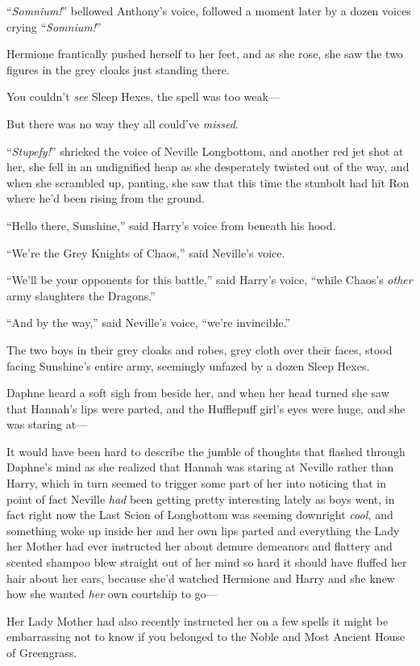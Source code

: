 “\emph{Somnium!}” bellowed Anthony’s voice, followed a moment later by a dozen voices crying “\emph{Somnium!}”

Hermione frantically pushed herself to her feet, and as she rose, she saw the two figures in the grey cloaks just standing there.

You couldn’t \emph{see} Sleep Hexes, the spell was too weak—

But there was no way they all could’ve \emph{missed}.

“\emph{Stupefy!}” shrieked the voice of Neville Longbottom, and another red jet shot at her, she fell in an undignified heap as she desperately twisted out of the way, and when she scrambled up, panting, she saw that this time the stunbolt had hit Ron where he’d been rising from the ground.

“Hello there, Sunshine,” said Harry’s voice from beneath his hood.

“We’re the Grey Knights of Chaos,” said Neville’s voice.

“We’ll be your opponents for this battle,” said Harry’s voice, “while Chaos’s \emph{other} army slaughters the Dragons.”

“And by the way,” said Neville’s voice, “we’re invincible.”

\later

The two boys in their grey cloaks and robes, grey cloth over their faces, stood facing Sunshine’s entire army, seemingly unfazed by a dozen Sleep Hexes.

Daphne heard a soft sigh from beside her, and when her head turned she saw that Hannah’s lips were parted, and the Hufflepuff girl’s eyes were huge, and she was staring at—

It would have been hard to describe the jumble of thoughts that flashed through Daphne’s mind as she realized that Hannah was staring at Neville rather than Harry, which in turn seemed to trigger some part of her into noticing that in point of fact Neville \emph{had} been getting pretty interesting lately as boys went, in fact right now the Last Scion of Longbottom was seeming downright \emph{cool,} and something woke up inside her and her own lips parted and everything the Lady her Mother had ever instructed her about demure demeanors and flattery and scented shampoo blew straight out of her mind so hard it should have fluffed her hair about her ears, because she’d watched Hermione and Harry and she knew how she wanted \emph{her} own courtship to go—

Her Lady Mother had also recently instructed her on a few spells it might be embarrassing not to know if you belonged to the Noble and Most Ancient House of Greengrass.

